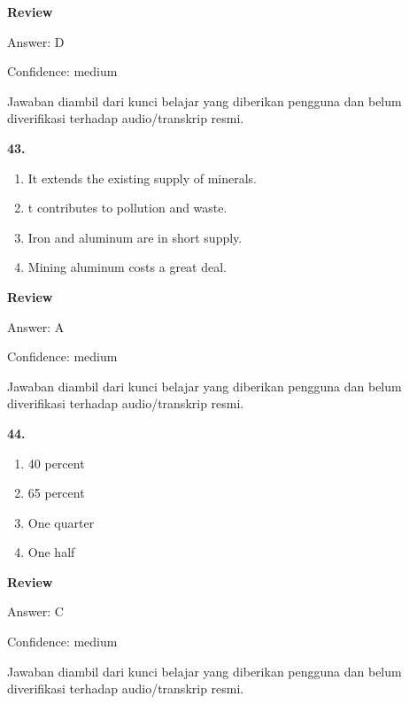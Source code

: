 \documentclass[12pt]{article}
\begin{document}
\par
\begingroup
\setlength{\parskip}{0pt}
\setlength{\parindent}{0pt}
\textbf{Review}\par
Answer: D\par
Confidence: medium\par
Jawaban diambil dari kunci belajar yang diberikan pengguna dan belum diverifikasi terhadap audio/transkrip resmi.\par
\endgroup
\par
\vspace{0.25\baselineskip}
\noindent\textbf{43.}
\begin{enumerate}[label=(\Alph*),leftmargin=*,itemsep=0.2em]
\item It extends the existing supply of minerals.
\item t contributes to pollution and waste.
\item Iron and aluminum are in short supply.
\item Mining aluminum costs a great deal.
\end{enumerate}
\par
\begingroup
\setlength{\parskip}{0pt}
\setlength{\parindent}{0pt}
\textbf{Review}\par
Answer: A\par
Confidence: medium\par
Jawaban diambil dari kunci belajar yang diberikan pengguna dan belum diverifikasi terhadap audio/transkrip resmi.\par
\endgroup
\par
\vspace{0.25\baselineskip}
\noindent\textbf{44.}
\begin{enumerate}[label=(\Alph*),leftmargin=*,itemsep=0.2em]
\item 40 percent
\item 65 percent
\item One quarter
\item One half
\end{enumerate}
\par
\begingroup
\setlength{\parskip}{0pt}
\setlength{\parindent}{0pt}
\textbf{Review}\par
Answer: C\par
Confidence: medium\par
Jawaban diambil dari kunci belajar yang diberikan pengguna dan belum diverifikasi terhadap audio/transkrip resmi.\par
\endgroup
\par
\vspace{0.25\baselineskip}
\end{document}
